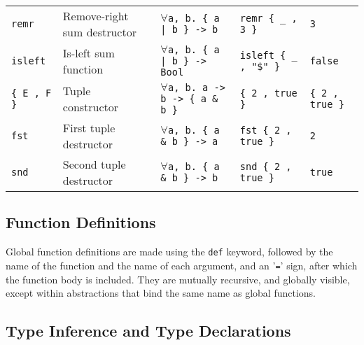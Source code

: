 \documentclass{article}
\begin{document}
{\begin{tabular}{ | p{17mm} | l | l | l | p{25mm} | }
    \texttt{remr}           & Remove-right sum destructor       & \texttt{$\forall$a, b. \{ a | b \} -> b}          & \texttt{remr \{ \_ , 3 \}}        & \texttt{3}                    \\
    \texttt{isleft}         & Is-left sum function              & \texttt{$\forall$a, b. \{ a | b \} -> Bool}       & \texttt{isleft \{ \_ , "\$" \}}   & \texttt{false}                \\
    \texttt{\{ E , F \}}    & Tuple constructor                 & \texttt{$\forall$a, b. a -> b -> \{ a \& b \}}    & \texttt{\{ 2 , true \}}           & \texttt{\{ 2 , true \}}       \\
    \texttt{fst}            & First tuple destructor            & \texttt{$\forall$a, b. \{ a \& b \} -> a}         & \texttt{fst \{ 2 , true \}}       & \texttt{2}                    \\
    \texttt{snd}            & Second tuple destructor           & \texttt{$\forall$a, b. \{ a \& b \} -> b}         & \texttt{snd \{ 2 , true \}}       & \texttt{true}                 \\
    \hline
\end{tabular}}
\subsection{Function Definitions}
Global function definitions are made using the \texttt{def} keyword, followed by the name of the function and the name of each argument, and an '\texttt{=}' sign, after which the function body is included. They are mutually recursive, and globally visible, except within abstractions that bind the same name as global functions.
\subsection{Type Inference and Type Declarations}
\end{document}

